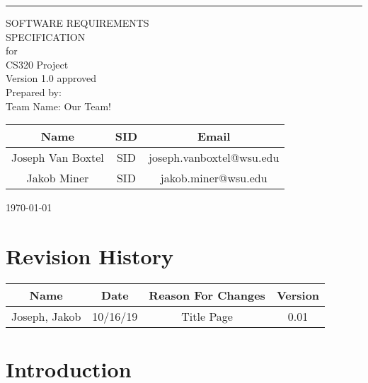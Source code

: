 \documentclass{scrreprt}
\date{}
\def\myversion{1.0 }
\begin{document}
\begin{flushright}
    \rule{16cm}{5pt}\vskip1cm
    \begin{bfseries}
        \Huge{SOFTWARE REQUIREMENTS\\ SPECIFICATION}\\
        \vspace{1.9cm}
        for\\
        \vspace{1.9cm}
       CS320 Project\\
        \vspace{1.9cm}
        \LARGE{Version \myversion approved}\\
        \vspace{1.9cm}
        Prepared by:\\
        Team Name: Our Team!
        \begin{center}
            \begin{tabular}{|c|c|c|}
                \hline
        	    Name & SID & Email\\
                \hline
        	    Joseph Van Boxtel & SID & joseph.vanboxtel@wsu.edu\\
                \hline
        	    Jakob Miner & SID & jakob.miner@wsu.edu\\
                \hline
            \end{tabular}
        \end{center}

        \vspace{1.9cm}
        \today\\
    \end{bfseries}
\end{flushright}

\tableofcontents


\chapter*{Revision History}

\begin{center}
    \begin{tabular}{|c|c|c|c|}
        \hline
	    Name & Date & Reason For Changes & Version\\
        \hline
	    Joseph, Jakob & 10/16/19 & Title Page & 0.01\\
        \hline
    \end{tabular}
\end{center}

\chapter{Introduction}
\end{document}
